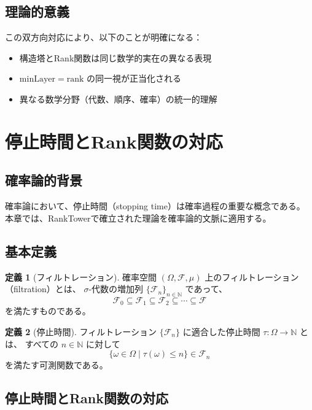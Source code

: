 \documentclass[a4paper,12pt]{ltjsarticle}
\theoremstyle{definition}
\newtheorem{definition}{定義}[section]
\newcommand{\N}{\mathbb{N}}
\newcommand{\F}{\mathcal{F}}
\newcommand{\rank}{\mathrm{rank}}
\newcommand{\minLayer}{\mathrm{minLayer}}
\begin{document}
\subsection{理論的意義}

この双方向対応により、以下のことが明確になる：
\begin{itemize}
  \item 構造塔とRank関数は同じ数学的実在の異なる表現
  \item $\minLayer = \rank$ の同一視が正当化される
  \item 異なる数学分野（代数、順序、確率）の統一的理解
\end{itemize}

\section{停止時間とRank関数の対応}

\subsection{確率論的背景}

確率論において、停止時間（stopping time）は確率過程の重要な概念である。
本章では、RankTowerで確立された理論を確率論的文脈に適用する。

\subsection{基本定義}

\begin{definition}[フィルトレーション]
確率空間 $(\Omega, \F, \mu)$ 上のフィルトレーション（filtration）とは、
$\sigma$-代数の増加列 $\{\F_n\}_{n \in \N}$ であって、
\[
\F_0 \subseteq \F_1 \subseteq \F_2 \subseteq \cdots \subseteq \F
\]
を満たすものである。
\end{definition}

\begin{definition}[停止時間]
フィルトレーション $\{\F_n\}$ に適合した停止時間 $\tau : \Omega \to \N$ とは、
すべての $n \in \N$ に対して
\[
\{\omega \in \Omega \mid \tau(\omega) \leq n\} \in \F_n
\]
を満たす可測関数である。
\end{definition}

\subsection{停止時間とRank関数の対応}
\end{document}
